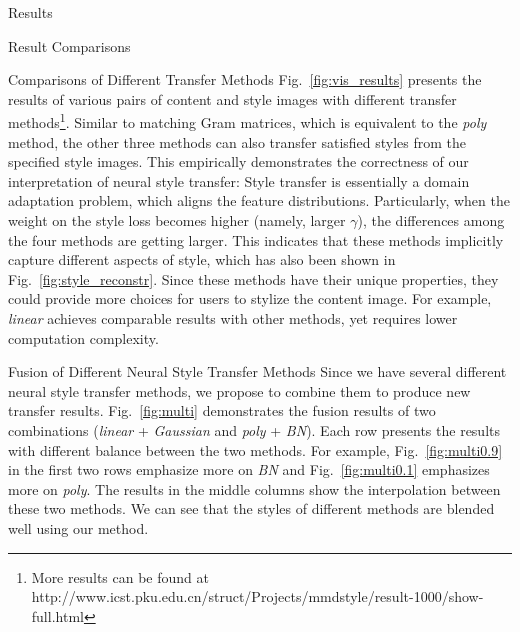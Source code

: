\documentclass{article}
\begin{document}
\begin{section}{Results}
\begin{subsection}{Result Comparisons}
\begin{paragraph}{Comparisons of Different Transfer Methods}
Fig.~\ref{fig:vis_results} presents the results of various pairs of content and style images with different transfer methods\footnote{More results can be found at\\ {{http://www.icst.pku.edu.cn/struct/Projects/mmdstyle/result-1000/show-full.html}}}. Similar to matching Gram matrices, which is equivalent to the \emph{poly} method, the other three methods can also transfer satisfied styles from the specified style images. This empirically demonstrates the correctness of our interpretation of neural style transfer: Style transfer is essentially a domain adaptation problem, which aligns the feature distributions. Particularly, when the weight on the style loss becomes higher (namely, larger $\gamma$), the differences among the four methods are getting larger. This indicates that these methods implicitly capture different aspects of style, which has also been shown in Fig.~\ref{fig:style_reconstr}. Since these methods have their unique properties, they could provide more choices for users to stylize the content image. For example, \emph{linear} achieves comparable results with other methods, yet requires lower computation complexity.




\end{paragraph}

\begin{paragraph}{Fusion of Different Neural Style Transfer Methods}
Since we have several different neural style transfer methods, we propose to combine them to produce new transfer results. Fig.~\ref{fig:multi} demonstrates the fusion results of two combinations (\emph{linear} + \emph{Gaussian} and \emph{poly} + \emph{BN}). Each row presents the results with different balance between the two methods. For example, Fig.~\ref{fig:multi0.9} in the first two rows emphasize more on \emph{BN} and Fig.~\ref{fig:multi0.1} emphasizes more on \emph{poly}. The results in the middle columns show the interpolation between these two methods. We can see that the styles of different methods are blended well using our method.




\end{paragraph}








\end{subsection}







\end{section}
\end{document}
